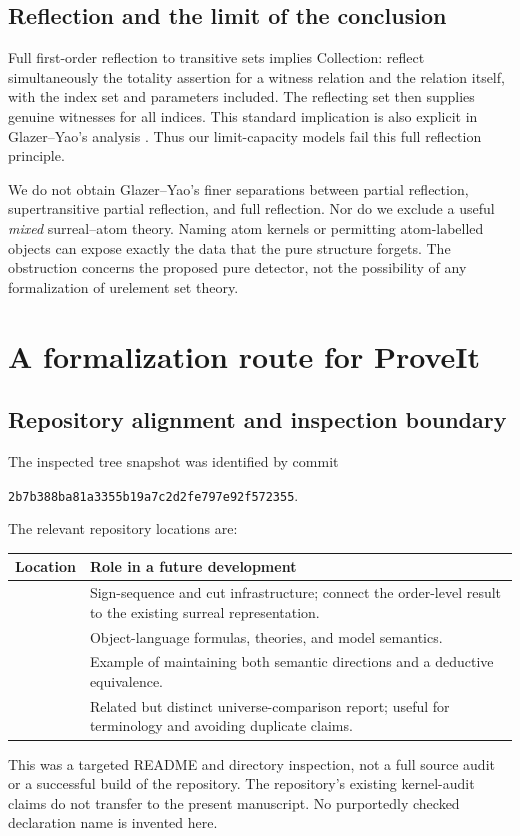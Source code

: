 \documentclass[11pt,letterpaper]{article}
\theoremstyle{definition}
\theoremstyle{remark}
\begin{document}
\subsection{Reflection and the limit of the conclusion}
Full first-order reflection to transitive sets implies Collection: reflect simultaneously the totality assertion for a witness relation and the relation itself, with the index set and parameters included. The reflecting set then supplies genuine witnesses for all indices. This standard implication is also explicit in Glazer--Yao's analysis \cite{GlazerYao}. Thus our limit-capacity models fail this full reflection principle.

We do not obtain Glazer--Yao's finer separations between partial reflection, supertransitive partial reflection, and full reflection. Nor do we exclude a useful \emph{mixed} surreal--atom theory. Naming atom kernels or permitting atom-labelled objects can expose exactly the data that the pure structure forgets. The obstruction concerns the proposed pure detector, not the possibility of any formalization of urelement set theory.

\section{A formalization route for ProveIt}
\label{hset:zr:sec:formalization}

\subsection{Repository alignment and inspection boundary}
The inspected tree snapshot was identified by commit
\begin{center}
\texttt{2b7b388ba81a3355b19a7c2d2fe797e92f572355}.
\end{center}
The relevant repository locations are:
\begin{center}
\small
\begin{tabularx}{\textwidth}{@{}P{0.48\textwidth}Y@{}}
\toprule
Location & Role in a future development \\
\midrule
{} & Sign-sequence and cut infrastructure; connect the order-level result to the existing surreal representation. \\
 & Object-language formulas, theories, and model semantics. \\
 & Example of maintaining both semantic directions and a deductive equivalence. \\
 & Related but distinct universe-comparison report; useful for terminology and avoiding duplicate claims. \\
\bottomrule
\end{tabularx}
\end{center}
This was a targeted README and directory inspection, not a full source audit or a successful build of the repository. The repository's existing kernel-audit claims do not transfer to the present manuscript. No purportedly checked declaration name is invented here.
\end{document}
